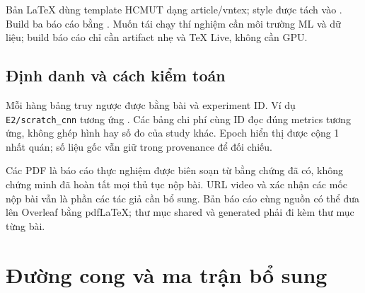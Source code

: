 \documentclass[11pt,a4paper]{article}
\begin{document}
Bản LaTeX dùng template HCMUT dạng article/vntex; style được tách vào . Build ba báo cáo bằng . Muốn tái chạy thí nghiệm cần môi trường ML và dữ liệu; build báo cáo chỉ cần artifact nhẹ và TeX Live, không cần GPU.

\subsection{Định danh và cách kiểm toán}
Mỗi hàng bảng truy ngược được bằng bài và experiment ID. Ví dụ \texttt{E2/scratch\_cnn} tương ứng . Các bảng chi phí cùng ID đọc đúng metrics tương ứng, không ghép hình hay số đo của study khác. Epoch hiển thị được cộng 1 nhất quán; số liệu gốc vẫn giữ trong provenance để đối chiếu.

Các PDF là báo cáo thực nghiệm được biên soạn từ bằng chứng đã có, không chứng minh đã hoàn tất mọi thủ tục nộp bài. URL video và xác nhận các mốc nộp bài vẫn là phần các tác giả cần bổ sung. Bản báo cáo cùng nguồn có thể đưa lên Overleaf bằng pdfLaTeX; thư mục shared và generated phải đi kèm thư mục từng bài.


\clearpage\appendix
\section{Đường cong và ma trận bổ sung}
\clearpage
{}
\end{document}
